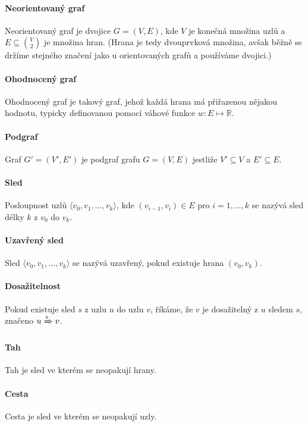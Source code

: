 \paragraph*{Neorientovaný graf} Neorientovaný graf je dvojice $G = (V, E)$, kde $V$ je konečná množina uzlů a $E \subseteq {V \choose 2}$ je množina hran. (Hrana je tedy dvouprvková množina, avšak běžně se držíme stejného značení jako u orientovaných grafů a používáme dvojici.)

\paragraph*{Ohodnocený graf} Ohodnocený graf je takový graf, jehož každá hrana má přiřazenou nějakou hodnotu, typicky definovanou pomocí váhové funkce $w : E \mapsto \mathbb{R}$.

\paragraph*{Podgraf} Graf $G' = (V', E')$ je podgraf grafu $G = (V, E)$ jestliže $V' \subseteq V$ a $E' \subseteq E$.

\paragraph*{Sled} Posloupnost uzlů $\langle v_0, v_1, \dots, v_k \rangle$, kde $(v_{i-1}, v_i) \in E$ pro $i = 1, \dots, k$ se nazývá sled délky $k$ z $v_0$ do $v_k$.

\paragraph*{Uzavřený sled} Sled $\langle v_0, v_1, \dots, v_k \rangle$ se nazývá uzavřený, pokud existuje hrana $(v_0, v_k)$.

\paragraph*{Dosažitelnost} Pokud existuje sled $s$ z uzlu $u$ do uzlu $v$, říkáme, že $v$ je dosažitelný z $u$ sledem $s$, značeno $u \xRightarrow{\text{s}} v$.

\paragraph*{Tah} Tah je sled ve kterém se neopakují hrany.

\paragraph*{Cesta} Cesta je sled ve kterém se neopakují uzly.

